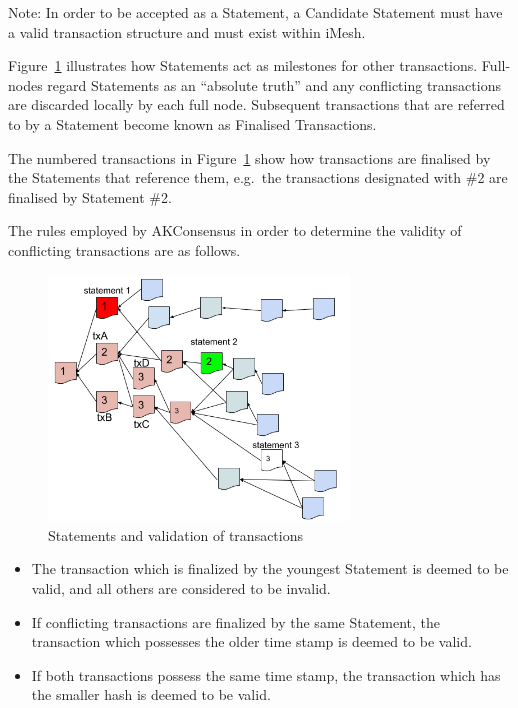 \documentclass[a4paper,10pt,twocolumn]{article}
\begin{document}
Note: In order to be accepted as a Statement, a Candidate Statement must have a valid transaction structure and must exist within iMesh.

Figure~\ref{fig:fba} illustrates how Statements act as milestones for other transactions.
Full-nodes regard Statements as an ``absolute truth'' and any conflicting transactions are discarded locally by each full node. 
Subsequent transactions that are referred to by a Statement become known as Finalised Transactions.

The numbered transactions in Figure~\ref{fig:fba} show how transactions are finalised by the Statements that reference them,
e.g.\ the transactions designated with \#2 are finalised by Statement \#2.

The rules employed by AKConsensus in order to determine the validity of conflicting transactions are as follows.

 \begin{figure}[ht]
	\begin{center}
	\includegraphics[width=80mm]{fba.png}
	  \caption{Statements and validation of transactions}
    \label{fig:fba}
	\end{center}
 \end{figure}

\begin{itemize}
	\item The transaction which is finalized by the youngest Statement is deemed to be valid, and all others are considered to be invalid.
	\item If conflicting transactions are finalized by the same Statement, the transaction which possesses the older time stamp is deemed 
	to be valid.
	\item If both transactions possess the same time stamp, the transaction which has the smaller hash is deemed to be valid.
\end{itemize}
\end{document}
